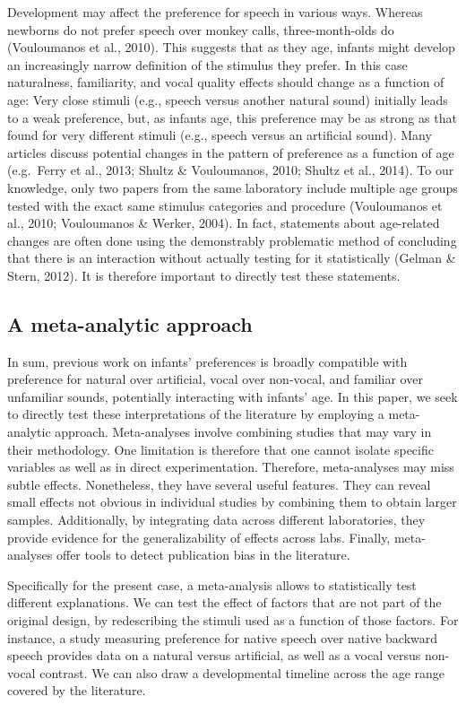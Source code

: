 \documentclass[man]{apa6}
\begin{document}
Development may affect the preference for speech in various ways.
Whereas newborns do not prefer speech over monkey calls,
three-month-olds do (Vouloumanos et al., 2010). This suggests that as
they age, infants might develop an increasingly narrow definition of the
stimulus they prefer. In this case naturalness, familiarity, and vocal
quality effects should change as a function of age: Very close stimuli
(e.g., speech versus another natural sound) initially leads to a weak
preference, but, as infants age, this preference may be as strong as
that found for very different stimuli (e.g., speech versus an artificial
sound). Many articles discuss potential changes in the pattern of
preference as a function of age (e.g.~Ferry et al., 2013; Shultz \&
Vouloumanos, 2010; Shultz et al., 2014). To our knowledge, only two
papers from the same laboratory include multiple age groups tested with
the exact same stimulus categories and procedure (Vouloumanos et al.,
2010; Vouloumanos \& Werker, 2004). In fact, statements about
age-related changes are often done using the demonstrably problematic
method of concluding that there is an interaction without actually
testing for it statistically (Gelman \& Stern, 2012). It is therefore
important to directly test these statements.

\subsection{A meta-analytic approach}\label{a-meta-analytic-approach}

In sum, previous work on infants' preferences is broadly compatible with
preference for natural over artificial, vocal over non-vocal, and
familiar over unfamiliar sounds, potentially interacting with infants'
age. In this paper, we seek to directly test these interpretations of
the literature by employing a meta-analytic approach. Meta-analyses
involve combining studies that may vary in their methodology. One
limitation is therefore that one cannot isolate specific variables as
well as in direct experimentation. Therefore, meta-analyses may miss
subtle effects. Nonetheless, they have several useful features. They can
reveal small effects not obvious in individual studies by combining them
to obtain larger samples. Additionally, by integrating data across
different laboratories, they provide evidence for the generalizability
of effects across labs. Finally, meta-analyses offer tools to detect
publication bias in the literature.

Specifically for the present case, a meta-analysis allows to
statistically test different explanations. We can test the effect of
factors that are not part of the original design, by redescribing the
stimuli used as a function of those factors. For instance, a study
measuring preference for native speech over native backward speech
provides data on a natural versus artificial, as well as a vocal versus
non-vocal contrast. We can also draw a developmental timeline across the
age range covered by the literature.
\end{document}
